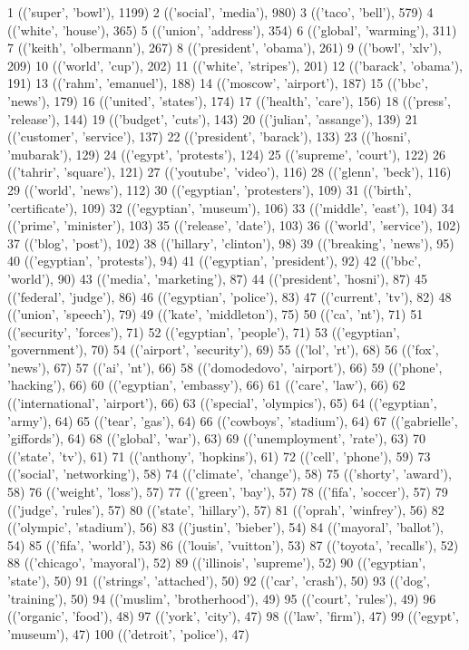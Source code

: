 \documentclass{article}
\begin{document}
\begin{spverbatim}
1 (('super', 'bowl'), 1199)
2 (('social', 'media'), 980)
3 (('taco', 'bell'), 579)
4 (('white', 'house'), 365)
5 (('union', 'address'), 354)
6 (('global', 'warming'), 311)
7 (('keith', 'olbermann'), 267)
8 (('president', 'obama'), 261)
9 (('bowl', 'xlv'), 209)
10 (('world', 'cup'), 202)
11 (('white', 'stripes'), 201)
12 (('barack', 'obama'), 191)
13 (('rahm', 'emanuel'), 188)
14 (('moscow', 'airport'), 187)
15 (('bbc', 'news'), 179)
16 (('united', 'states'), 174)
17 (('health', 'care'), 156)
18 (('press', 'release'), 144)
19 (('budget', 'cuts'), 143)
20 (('julian', 'assange'), 139)
21 (('customer', 'service'), 137)
22 (('president', 'barack'), 133)
23 (('hosni', 'mubarak'), 129)
24 (('egypt', 'protests'), 124)
25 (('supreme', 'court'), 122)
26 (('tahrir', 'square'), 121)
27 (('youtube', 'video'), 116)
28 (('glenn', 'beck'), 116)
29 (('world', 'news'), 112)
30 (('egyptian', 'protesters'), 109)
31 (('birth', 'certificate'), 109)
32 (('egyptian', 'museum'), 106)
33 (('middle', 'east'), 104)
34 (('prime', 'minister'), 103)
35 (('release', 'date'), 103)
36 (('world', 'service'), 102)
37 (('blog', 'post'), 102)
38 (('hillary', 'clinton'), 98)
39 (('breaking', 'news'), 95)
40 (('egyptian', 'protests'), 94)
41 (('egyptian', 'president'), 92)
42 (('bbc', 'world'), 90)
43 (('media', 'marketing'), 87)
44 (('president', 'hosni'), 87)
45 (('federal', 'judge'), 86)
46 (('egyptian', 'police'), 83)
47 (('current', 'tv'), 82)
48 (('union', 'speech'), 79)
49 (('kate', 'middleton'), 75)
50 (('ca', 'nt'), 71)
51 (('security', 'forces'), 71)
52 (('egyptian', 'people'), 71)
53 (('egyptian', 'government'), 70)
54 (('airport', 'security'), 69)
55 (('lol', 'rt'), 68)
56 (('fox', 'news'), 67)
57 (('ai', 'nt'), 66)
58 (('domodedovo', 'airport'), 66)
59 (('phone', 'hacking'), 66)
60 (('egyptian', 'embassy'), 66)
61 (('care', 'law'), 66)
62 (('international', 'airport'), 66)
63 (('special', 'olympics'), 65)
64 (('egyptian', 'army'), 64)
65 (('tear', 'gas'), 64)
66 (('cowboys', 'stadium'), 64)
67 (('gabrielle', 'giffords'), 64)
68 (('global', 'war'), 63)
69 (('unemployment', 'rate'), 63)
70 (('state', 'tv'), 61)
71 (('anthony', 'hopkins'), 61)
72 (('cell', 'phone'), 59)
73 (('social', 'networking'), 58)
74 (('climate', 'change'), 58)
75 (('shorty', 'award'), 58)
76 (('weight', 'loss'), 57)
77 (('green', 'bay'), 57)
78 (('fifa', 'soccer'), 57)
79 (('judge', 'rules'), 57)
80 (('state', 'hillary'), 57)
81 (('oprah', 'winfrey'), 56)
82 (('olympic', 'stadium'), 56)
83 (('justin', 'bieber'), 54)
84 (('mayoral', 'ballot'), 54)
85 (('fifa', 'world'), 53)
86 (('louis', 'vuitton'), 53)
87 (('toyota', 'recalls'), 52)
88 (('chicago', 'mayoral'), 52)
89 (('illinois', 'supreme'), 52)
90 (('egyptian', 'state'), 50)
91 (('strings', 'attached'), 50)
92 (('car', 'crash'), 50)
93 (('dog', 'training'), 50)
94 (('muslim', 'brotherhood'), 49)
95 (('court', 'rules'), 49)
96 (('organic', 'food'), 48)
97 (('york', 'city'), 47)
98 (('law', 'firm'), 47)
99 (('egypt', 'museum'), 47)
100 (('detroit', 'police'), 47)	
\end{spverbatim}
\end{document}
